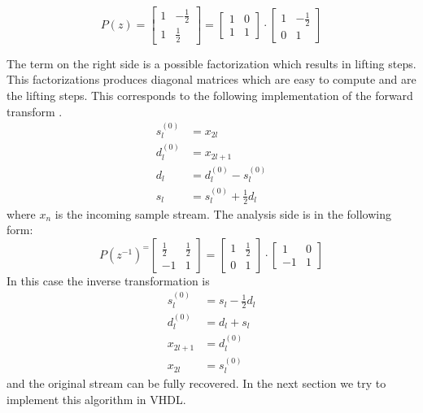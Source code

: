 \begin{refsection}
\begin{equation*}
P(z) =
\begin{bmatrix}
1 & -\frac{1}{2} \\
1 & \frac{1}{2}
\end{bmatrix}
 = 
 \begin{bmatrix}
 1 & 0 \\
 1 & 1
 \end{bmatrix}
 \cdot
 \begin{bmatrix}
 1 & -\frac{1}{2} \\
 0 & 1
 \end{bmatrix}
\end{equation*}

The term on the right side is a possible factorization which results in lifting steps.
This factorizations produces diagonal matrices which are easy to compute and are the lifting steps.
This corresponds to the following implementation of the forward transform \cite{fpga:Daubechies1998}.
\begin{equation}\label{fpga:equation:haar}
	\begin{aligned}
	s_l^{(0)} &= x_{2l} \\
	d_l^{(0)} &= x_{2l+1} \\ 
	d_l &= d_l^{(0)} - s_l^{(0)} \\
	s_l &= s_l^{(0)} + \frac{1}{2}d_l
	\end{aligned}
\end{equation}
where $x_{n}$ is the incoming sample stream.
The analysis side is in the following form:
\begin{equation*}
P(z^{-1})^ =
\begin{bmatrix}
\frac{1}{2} & \frac{1}{2} \\
-1 & 1
\end{bmatrix}
= 
\begin{bmatrix}
1 & \frac{1}{2} \\
0 & 1
\end{bmatrix}
\cdot
\begin{bmatrix}
1 & 0 \\
-1 & 1
\end{bmatrix}
\end{equation*}
In this case the inverse transformation is 
\begin{equation}\label{fpga:equation:inv_haar}
\begin{aligned}
s_l^{(0)} &= s_l - \frac{1}{2}d_l \\
d_l^{(0)} &= d_l + s_l \\ 
x_{2l+1}& =d_l^{(0)} \\
x_{2l} &= s_l^{(0)}
\end{aligned}
\end{equation}
and the original stream can be fully recovered.
In the next section we try to implement this algorithm in VHDL.


\end{refsection}
